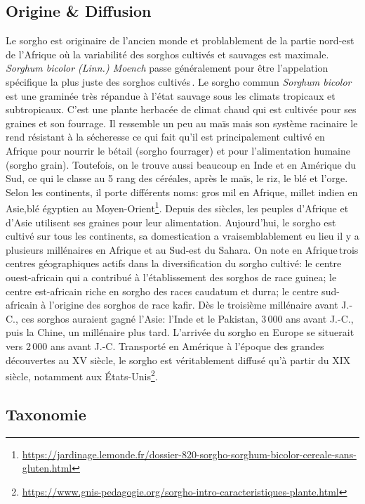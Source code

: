 \documentclass[a4paper,11pt]{article}
\begin{document}
  
\subsection{Origine \& Diffusion}

Le sorgho est originaire de l'ancien monde et problablement de la
partie nord-est de l'Afrique où la variabilité des sorghos cultivés et
sauvages est maximale. \emph{ Sorghum bicolor (Linn.) Moench} passe
généralement pour être l'appelation spécifique la plus juste des
sorghos cultivés\,\cite{food1977introduction}. Le sorgho commun
\emph{Sorghum bicolor} est une graminée très répandue à l’état sauvage
sous les climats tropicaux et subtropicaux. C’est une plante herbacée
de climat chaud qui est cultivée pour ses graines et son fourrage. Il
ressemble un peu au maïs mais son système racinaire le rend résistant
à la sécheresse ce qui fait qu'il est principalement cultivé en
Afrique pour nourrir le bétail (sorgho fourrager) et pour
l'alimentation humaine (sorgho grain). Toutefois, on le trouve aussi
beaucoup en Inde et en Amérique du Sud, ce qui le classe au 5\ieme{} rang
des céréales, après le maïs, le riz, le blé et l'orge. Selon les
continents, il porte différents noms: \og{}gros mil\fg{} en Afrique,
\og{}millet indien\fg{} en Asie,\og{}blé égyptien\fg{} au
Moyen-Orient\footnote{\url{https://jardinage.lemonde.fr/dossier-820-sorgho-sorghum-bicolor-cereale-sans-gluten.html}}. Depuis
des siècles, les peuples d’Afrique et d’Asie utilisent ses graines
pour leur alimentation. Aujourd’hui, le sorgho est cultivé sur tous
les continents, sa domestication a vraisemblablement eu lieu il y a
plusieurs millénaires en Afrique et au Sud-est du Sahara. On note en
Afrique\,trois centres géographiques actifs dans la diversification du
sorgho cultivé: le centre ouest-africain qui a contribué à
l’établissement des sorghos de race guinea; le centre est-africain
riche en sorgho des races caudatum et durra; le centre sud-africain à
l’origine des sorghos de race kafir. Dès le troisième millénaire avant
J.-C., ces sorghos auraient gagné l’Asie: l’Inde et le Pakistan,
3\,000 ans avant J.-C., puis la Chine, un millénaire plus
tard. L’arrivée du sorgho en Europe se situerait vers 2\,000 ans avant
J.-C. Transporté en Amérique à l’époque des grandes découvertes au
XV\ieme{} siècle, le sorgho est véritablement diffusé qu’à partir du
XIX\ieme{} siècle, notamment aux
États-Unis\footnote{\url{https://www.gnis-pedagogie.org/sorgho-intro-caracteristiques-plante.html}}.

\subsection{Taxonomie}
\end{document}
